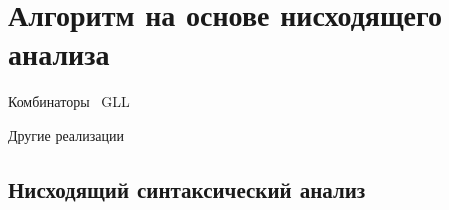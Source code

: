 \section{Алгоритм на основе нисходящего анализа}

Комбинаторы~\cite{Verbitskaia:2018:PCC:3241653.3241655}
GLL~\cite{Grigorev:2017:CPQ:3166094.3166104}

Другие реализации~\cite{MEDEIROS201975}

\subsection{Нисходящий синтаксический анализ}
